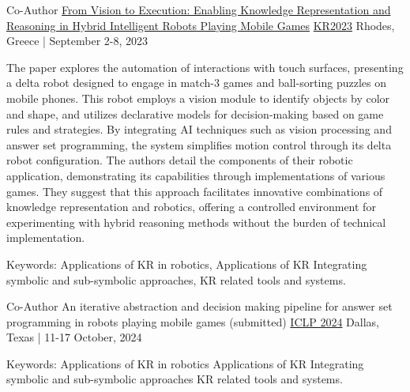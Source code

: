 
\begin{cventries}

\cventry
    {Co-Author} %
    {\href{https://proceedings.kr.org/2023/5/}{From Vision to Execution: Enabling Knowledge Representation and Reasoning in Hybrid Intelligent Robots Playing Mobile Games}} %
    {\href{https://kr.org/KR2023/}{KR2023}} %
    {Rhodes, Greece | September 2-8, 2023} %
    {
      \begin{cvitems} %
        \item{The paper explores the automation of interactions with touch surfaces, presenting a delta robot designed to engage in match-3 games and ball-sorting puzzles on mobile phones. This robot employs a vision module to identify objects by color and shape, and utilizes declarative models for decision-making based on game rules and strategies. By integrating AI techniques such as vision processing and answer set programming, the system simplifies motion control through its delta robot configuration. The authors detail the components of their robotic application, demonstrating its capabilities through implementations of various games. They suggest that this approach facilitates innovative combinations of knowledge representation and robotics, offering a controlled environment for experimenting with hybrid reasoning methods without the burden of technical implementation.}
        \item Keywords: Applications of KR in robotics, Applications of KR Integrating symbolic and sub-symbolic approaches, KR related tools and systems.
      \end{cvitems}
    }

\cventry
    {Co-Author} %
    {An iterative abstraction and decision making pipeline for answer set programming in robots playing mobile games (submitted)} %
    {\href{https://www.iclp24.utdallas.edu/}{ICLP 2024}} %
    {Dallas, Texas | 11-17 October, 2024} %
    {
      \begin{cvitems} %
        \item Keywords: Applications of KR in robotics Applications of KR Integrating symbolic and sub-symbolic approaches KR related tools and systems.
      \end{cvitems}
    }




\end{cventries}
